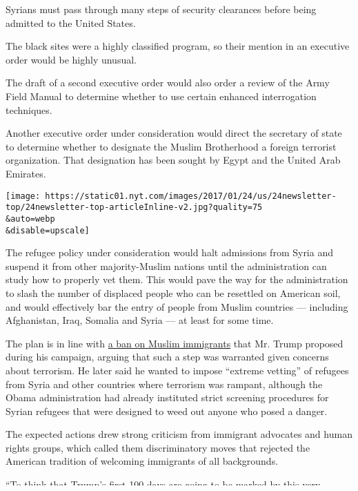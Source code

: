 Syrians must pass through many steps of security clearances before being
admitted to the United States.

The black sites were a highly classified program, so their mention in an
executive order would be highly unusual.

The draft of a second executive order would also order a review of the
Army Field Manual to determine whether to use certain enhanced
interrogation techniques.

Another executive order under consideration would direct the secretary
of state to determine whether to designate the Muslim Brotherhood a
foreign terrorist organization. That designation has been sought by
Egypt and the United Arab Emirates.

\texttt{[image: https://static01.nyt.com/images/2017/01/24/us/24newsletter-top/24newsletter-top-articleInline-v2.jpg?quality=75\\\&auto=webp\\\&disable=upscale]}

The refugee policy under consideration would halt admissions from Syria
and suspend it from other majority-Muslim nations until the
administration can study how to properly vet them. This would pave the
way for the administration to slash the number of displaced people who
can be resettled on American soil, and would effectively bar the entry
of people from Muslim countries --- including Afghanistan, Iraq, Somalia
and Syria --- at least for some time.

The plan is in line with
\href{http://www.nytimes.com/politics/first-draft/2015/12/07/donald-trump-calls-for-banning-muslims-from-entering-u-s/}{a
ban on Muslim immigrants} that Mr. Trump proposed during his campaign,
arguing that such a step was warranted given concerns about terrorism.
He later said he wanted to impose ``extreme vetting'' of refugees from
Syria and other countries where terrorism was rampant, although the
Obama administration had already instituted strict screening procedures
for Syrian refugees that were designed to weed out anyone who posed a
danger.

The expected actions drew strong criticism from immigrant advocates and
human rights groups, which called them discriminatory moves that
rejected the American tradition of welcoming immigrants of all
backgrounds.

``To think that Trump's first 100 days are going to be marked by this
very shameful shutting of our doors to everybody who is seeking refuge
in this country is very concerning,'' said Marielena Hincapié, the
executive director of the National Immigration Law Center. ``Everything
points to this being simply a backdoor Muslim ban.''

